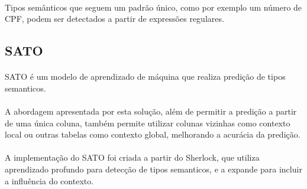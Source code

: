 \paragraph{} Tipos semânticos que seguem um padrão único, como por exemplo um número de CPF, podem ser detectados a partir de expressões regulares.
 
\subsection{SATO}

\paragraph{} SATO\cite{zhang2019sato} é um modelo de aprendizado de máquina que realiza predição de tipos semanticos.

\paragraph{} A abordagem apresentada por esta solução, além de permitir a predição a partir de uma única coluna, também permite utilizar colunas vizinhas como contexto local ou outras tabelas como contexto global, melhorando a acurácia da predição.

\paragraph{} A implementação do SATO foi criada a partir do Sherlock\cite{hulsebos2019sherlock}, que utiliza aprendizado profundo para detecção de tipos semanticos, e a expande para incluir a influência do contexto.


